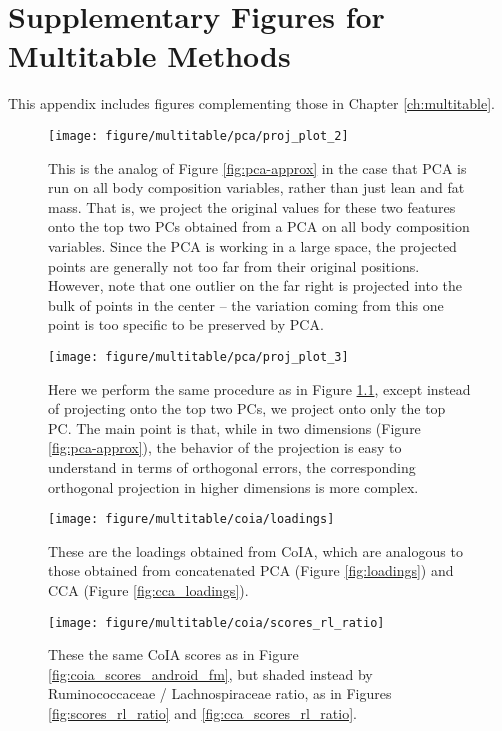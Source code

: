 \chapter{Supplementary Figures for Multitable Methods}
\label{ch:multitable_supp_figs}

This appendix includes figures complementing those in Chapter
\ref{ch:multitable}.

\begin{figure}
  \centering
  \texttt{[image: figure/multitable/pca/proj\_plot\_2]}
  \caption{This is the analog of Figure \ref{fig:pca-approx} in the case that
    PCA is run on all body composition variables, rather than just lean and
    fat mass. That is, we project the original values for these two features
    onto the top two PCs obtained from a PCA on all body composition variables.
    Since the PCA is working in a large space, the projected points are
    generally not too far from their original positions. However, note that one
    outlier on the far right is projected into the bulk of points in the center
    -- the variation coming from this one point is too specific to be preserved
    by PCA.
  \label{fig:pca-approx-2}}
\end{figure}

\begin{figure}
  \centering
  \texttt{[image: figure/multitable/pca/proj\_plot\_3]}
  \caption{Here we perform the same procedure as in Figure
    \ref{fig:pca-approx-2}, except instead of projecting onto the top two PCs,
    we project onto only the top PC. The main point is that, while in two
    dimensions (Figure \ref{fig:pca-approx}), the behavior of the projection is
    easy to understand in terms of orthogonal errors, the corresponding
    orthogonal projection in higher dimensions is more complex.
  \label{fig:pca-approx-3}}
\end{figure}

\begin{figure}
  \centering \texttt{[image: figure/multitable/coia/loadings]}
  \caption{These are the loadings obtained from CoIA, which are analogous to
    those obtained from concatenated PCA (Figure \ref{fig:loadings}) and CCA
    (Figure \ref{fig:cca_loadings}). \label{fig:coia_loadings} }
\end{figure}

\begin{figure}
  \centering
  \texttt{[image: figure/multitable/coia/scores\_rl\_ratio]}
  \caption{These the same CoIA scores as in Figure \ref{fig:coia_scores_android_fm},
    but shaded instead by Ruminococcaceae / Lachnospiraceae ratio, as in Figures
    \ref{fig:scores_rl_ratio} and
    \ref{fig:cca_scores_rl_ratio}. \label{fig:coia_scores_rl_ratio} }
\end{figure}


